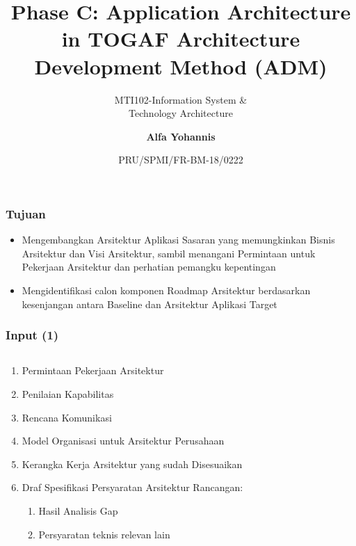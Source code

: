 \documentclass[aspectratio=169, table]{beamer}
\subtitle{MTI102-Information System \&\\Technology Architecture}
\title{\Large Phase C: Application Architecture\\in TOGAF
	Architecture\\Development Method (ADM)}
\date[Serial]{\scriptsize {PRU/SPMI/FR-BM-18/0222}}
\author[Pradita]{\small {\textbf{Alfa Yohannis}}}
\begin{document}
\frame{\titlepage}

\begin{frame}
\frametitle{Tujuan}
\begin{itemize}
\item Mengembangkan Arsitektur Aplikasi Sasaran yang memungkinkan Bisnis
Arsitektur dan Visi Arsitektur, sambil menangani Permintaan
untuk Pekerjaan Arsitektur dan perhatian pemangku kepentingan
\item Mengidentifikasi calon komponen Roadmap Arsitektur berdasarkan kesenjangan
antara Baseline dan Arsitektur Aplikasi Target
\end{itemize}
\end{frame}

	\begin{frame}
	\frametitle{Input (1)}
        \vspace{20pt}
	\begin{columns}
		\begin{column}{0.5\textwidth}
			\begin{center}
				\begin{enumerate}
					\item Permintaan Pekerjaan Arsitektur
					\item Penilaian Kapabilitas
					\item Rencana Komunikasi
					\item Model Organisasi untuk Arsitektur Perusahaan
					\item Kerangka Kerja Arsitektur yang sudah Disesuaikan
					\item Draf Spesifikasi Persyaratan Arsitektur Rancangan:
					\begin{enumerate}
						\item Hasil Analisis Gap
						\item Persyaratan teknis relevan lain
					\end{enumerate}
				\end{enumerate}
			\end{center}
		\end{column}


\end{columns}
\end{frame}
\end{document}
